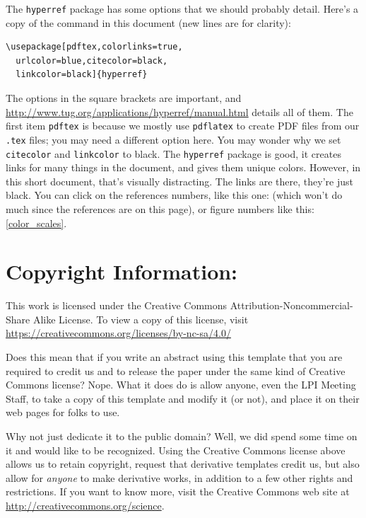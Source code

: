 \documentclass[twoside, 10pt]{article}
\begin{document}
The \verb=hyperref= package has some options that we should probably 
detail.  Here's a copy of the command in this document (new lines
are for clarity):
\begin{verbatim}
\usepackage[pdftex,colorlinks=true,
  urlcolor=blue,citecolor=black,
  linkcolor=black]{hyperref}
\end{verbatim}
\noindent
The options in the square brackets are important, and
\href{http://www.tug.org/applications/hyperref/manual.html}{http://www.tug.org/applications/hyperref/manual.html} details
all of them.  The first item \verb=pdftex= is because we mostly use
\verb=pdflatex= to create PDF files from our \verb=.tex= files; you may 
need a different option here.  You may wonder
why we set \verb=citecolor= and \verb=linkcolor= to black.  The
\verb=hyperref= package is good, it creates links for many 
things in the document, and gives them unique colors.
However, in this short document, that's visually distracting. 
The links are there, they're just black. You can click on the references
numbers, like this one: \citep{kopka2003guide} (which won't do much since
the references are on this page), or figure numbers like
this: \ref{color_scales}.


\section*{Copyright Information:}

This work is licensed under the Creative Commons
Attribution-Noncommercial-Share Alike License. To view a copy
of this license, visit \href{https://creativecommons.org/licenses/by-nc-sa/4.0/}{https://creativecommons.org/licenses/by-nc-sa/4.0/}

Does this mean that if you write an abstract using this template that
you are required to credit us and to release the paper under
the same kind of Creative Commons license?  Nope. What it does do is allow
anyone, even the LPI Meeting Staff, to take a copy of this template
and modify it (or not), and place it on their web pages for folks
to use.

Why not just dedicate it to the public domain?  Well,
we did spend some time on it and would like to be recognized.  Using
the Creative Commons license above allows us to retain copyright,
request that derivative templates credit us, but also allow for
\emph{anyone} to make derivative works, in addition to a few other
rights and restrictions.  If you want to know more, visit the
Creative Commons web site at \href{https://creativecommons.org/science/}{http://creativecommons.org/science}.
\end{document}
